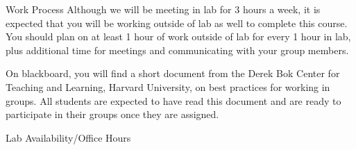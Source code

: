 \begin{frame}{Work Process}
Although we will be meeting in lab for 3 hours a week, it is expected that you will be working outside of lab as well to complete this course. You should plan on at least 1 hour of work outside of lab for every 1 hour in lab, plus additional time for meetings and communicating with your group members.

On blackboard, you will find a short document from the Derek Bok Center for Teaching and Learning, Harvard University, on best practices for working in groups. All students are expected to have read this document and are ready to participate in their groups once they are assigned. 
\end{frame}

\begin{frame}{Lab Availability/Office Hours}


\begin{calendar}{\hsize}









\end{calendar}
\end{frame}
